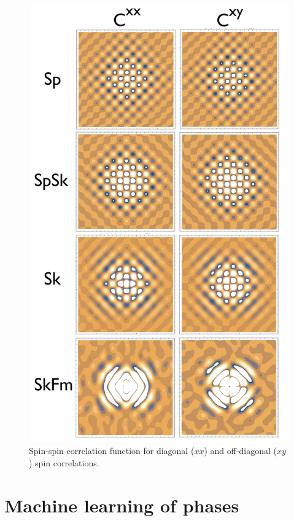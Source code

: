 \documentclass[reprint,amsmath,amssymb,aps,showpacs,onecolumn,superscriptaddress,prb]{revtex4-1}
\begin{document}
\begin{widetext}
\begin{figure}[ht]
\includegraphics[scale=0.4]{SMfig2.png}
\caption{Spin-spin correlation function for diagonal ($xx$) and off-diagonal ($xy$) spin correlations.}\label{fig:SM1}
\end{figure}

\section{Machine learning of phases}


\end{widetext}
\end{document}
